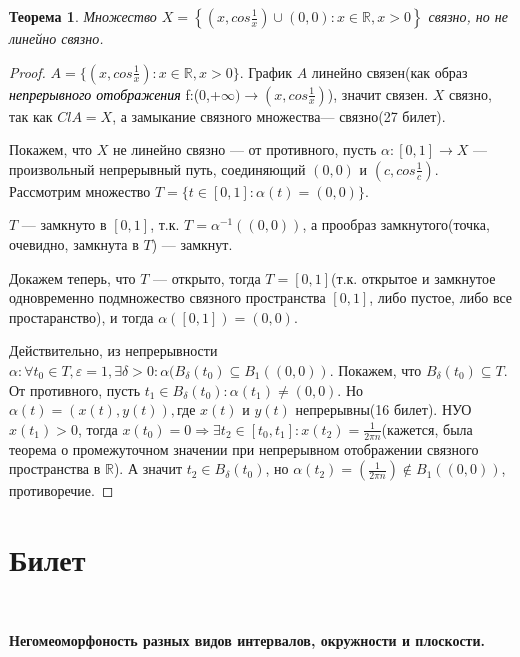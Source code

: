 \documentclass[a4paper,100pt]{article}
\theoremstyle{indented}
\newtheorem{theorem}{Теорема}
\begin{document}
    \begin{theorem}
        Множество $X = \left\{(x, cos\frac{1}{x}) \cup (0,0):x \in \mathbb R, x > 0\right\}$ связно, но не линейно связно.
    \end{theorem}
    
    \begin{proof}
        $A = \{(x,cos\frac{1}x):x \in \mathbb R, x > 0\}$. График $A$ линейно связен(как образ \textit{\textcolor{black}{непрерывного отображения}} f:(0,+$\infty)\rightarrow(x, cos\frac1x)$), значит связен. $X$ связно, так как $ClA = X$, а замыкание связного множества--- связно(27 билет). 
        
        Покажем, что $X$ не линейно связно --- от противного, пусть $\alpha :[0,1] \rightarrow X$ --- произвольный непрерывный путь, соединяющий $(0,0)$ и $(c,cos\frac1c)$. Рассмотрим множество $T =\{t \in [0,1]:\alpha(t) = (0,0)\}$.
        
        $T$ --- замкнуто в $[0,1]$, т.к. $T = \alpha^{-1}((0,0))$, а прообраз замкнутого(точка, очевидно, замкнута в $T$) --- замкнут.
        
        Докажем теперь, что $T$ --- открыто, тогда $T = [0,1]$(т.к. открытое и замкнутое одновременно подмножество связного пространства $[0,1]$, либо пустое, либо все простаранство), и тогда $\alpha([0,1]) = (0,0)$. 
        
        Действительно, из непрерывности $\alpha: \forall t_0 \in T, \varepsilon = 1, \exists \delta > 0: \alpha(B_\delta(t_0) \subseteq B_1((0,0))$. Покажем, что $B_\delta(t_0) \subseteq T.$ От противного, пусть $t_1 \in B_\delta(t_0): \alpha(t_1) \neq (0,0).$ Но $\alpha(t) = (x(t),y(t)), \text{где } x(t)$ и $y(t)$ непрерывны(16 билет). НУО $x(t_1) > 0$, тогда $x(t_0) = 0 \Rightarrow \exists t_2 \in [t_0,t_1]: x(t_2) = \frac1{2\pi n}$(кажется, была теорема о промежуточном значении при непрерывном отображении связного пространства в $\mathbb R$). А значит $t_2 \in B_\delta(t_0)$, но $\alpha(t_2) = (\frac1{2\pi n}) \notin B_1((0,0))$, противоречие. 
    \end{proof}

\section{Билет} \

\medskip

\textbf{Негомеоморфоность разных видов интервалов, окружности и плоскости.}\\
\end{document}

